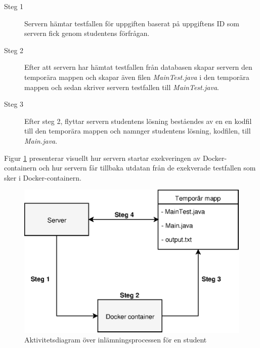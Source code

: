 \documentclass[a4paper,11pt]{article}
\begin{document}
{\begin{description}
    \item [Steg 1] Servern hämtar testfallen för uppgiften baserat på uppgiftens ID som servern fick genom studentens förfrågan.
    \item [Steg 2] Efter att servern har hämtat testfallen från databasen skapar servern den temporära mappen och skapar även filen \textit{MainTest.java} i den temporära mappen och sedan skriver servern testfallen till \textit{MainTest.java}.
    \item [Steg 3] Efter steg 2, flyttar servern studentens lösning beståendes av en en kodfil till den temporära mappen och namnger studentens lösning, kodfilen, till \textit{Main.java}.
\end{description}

\newpage
Figur \ref{fig:leapTeknisk2} presenterar visuellt hur servern startar exekveringen av Docker-containern och hur servern får tillbaka utdatan från de exekverade testfallen som sker i Docker-containern.

\begin{figure}[ht!]
\centering
\includegraphics[scale=0.8]{leap_teknisk_2.eps}
\caption{Aktivitetsdiagram över inlämningsprocessen för en student}
\label{fig:leapTeknisk2}
\end{figure}

}
\end{document}
